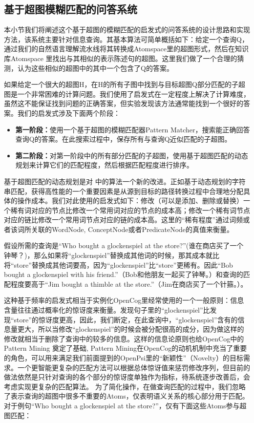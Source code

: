 \subsection{基于超图模糊匹配的问答系统}

本小节我们将阐述这个基于超图的模糊匹配的启发式的问答系统的设计思路和实现方法，该系统主要针对信息查询。其基本算法可简单概括如下：给定一个查询Q，通过我们的自然语言理解流水线将其转换成Atomspace里的超图形式，然后在知识库Atomspace 里找出与其相似的表示陈述句的超图。这里我们做了一个合理的猜测，认为这些相似的超图中的其中一个包含了Q的答案。

如果给定一个很大的超图H，在H的所有子图中找到与目标超图Q部分匹配的子超图是一个非常困难的计算问题。我们使用了启发式在一定程度上解决了计算难度，虽然这不能保证找到问题的正确答案，但实验发现该方法通常能找到一个很好的答案。我们的启发式涉及下面两个阶段：

\begin{itemize}
\item {\bf 第一阶段：}使用一个基于超图的模糊匹配器Pattern Matcher，搜索能正确回答查询Q的答案。在此搜索过程中，保存所有与查询Q近似匹配的子超图。
\item {\bf 第二阶段：}对第一阶段中的所有部分匹配的子超图，使用基于超图匹配的动态规划来计算它们的匹配程度，然后根据匹配程度进行排序。
\end{itemize}
基于超图匹配的动态规划是对 \cite{Zass2008}中的算法一个新的改进。正如基于动态规划的字符串匹配，获得高性能的一个重要因素是从源到目标的路径转换过程中合理地分配具体的操作成本。我们对此使用的启发式如下：修改（可以是添加、删除或替换）一个稀有词对应的节点比修改一个常用词对应的节点的成本高；修改一个稀有词节点对应的链比修改一个常用词节点对应的链的成本高。这里的“稀有程度”通过词频或者该词所关联的WordNode, ConceptNode或者PredicateNode的真值来衡量。

假设所需的查询是“Who bought a glockenspiel at the store?”(谁在商店买了一个钟琴？)，那么如果将“glockenspiel”替换成其他词的时候，那其成本就比将“store”替换成其他词要高，因为“glockenspiel”比“store”更稀有。因此“Bob bought a glockenspiel with his friend.”（Bob和他朋友一起买了钟琴。）和查询的匹配程度要高于“Jim bought a thimble at the store.”（Jim在商店买了一个针箍。）。

这种基于频率的启发式相当于实例化OpenCog里经常使用的一个一般原则：信息含量往往通过概率化的惊讶度来衡量。发现句子里的“glockenspiel”比发现“store”的惊讶度更高，因此，我们断定，在此查询中，“glockenspiel”含有的信息量更大，所以当修改“glockenspiel”的时候会被分配很高的成分，因为做这样的修改就相当于删除了查询中的较多的信息。这样的信息论原则也给OpenCog中的Pattern Mining\cite{ONeill2012} 奠定了基础, Pattern Mining在OpenCog的动机机制中充当了重要的角色，可以用来满足我们前面提到的OpenPsi里的“新颖性”（Novelty）的目标需求。一个更智能更复杂的匹配方法可以根据总体惊讶值来惩罚修改序列，但目前的做法依然是只针对查询的各个部分的惊讶度单独作为指标，待系统逐步改善后，会考虑实现更复杂的匹配算法。
为了简化操作，在做查询匹配的过程中，我们忽略了表示查询的超图中很多不重要的Atoms，仅表明语义关系的核心部分用于匹配。对于例句“Who bought a glockenspiel at the store?”，仅有下面这些Atoms参与超图匹配：

